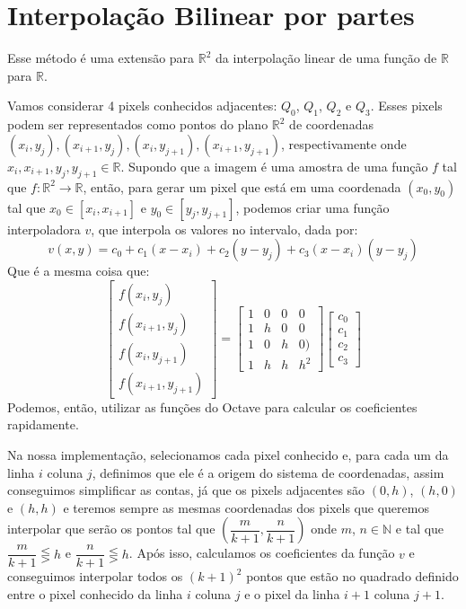 \documentclass{article}
\begin{document}
	\section{Interpolação Bilinear por partes}
	Esse método é uma extensão para $\mathbb{R}^2$ da interpolação linear de uma função de $\mathbb{R}$ para $\mathbb{R}$. \par
	Vamos considerar 4 pixels conhecidos adjacentes: $Q_{0}$, $Q_{1}$, $Q_{2}$ e $Q_{3}$. Esses pixels podem ser representados como pontos do plano $\mathbb{R}^2$ de coordenadas $(x_{i}, y_{j}), (x_{i+1}, y_{j}), (x_{i}, y_{j+1}), (x_{i+1}, y_{j+1})$, respectivamente onde $x_{i}, x_{i+1}, y_{j}, y_{j+1} \in \mathbb{R}$. Supondo que a imagem é uma amostra de uma função $f$ tal que $f: \mathbb{R}^2 \rightarrow \mathbb{R} $, então, para gerar um pixel que está em uma coordenada $(x_{0}, y_{0})$ tal que $x_{0} \in [x_{i}, x_{i+1}]$ e $y_{0} \in [y_{j}, y_{j+1}]$, podemos criar uma função interpoladora $v$, que interpola os valores no intervalo, dada por:
	 \begin{equation}
	 v(x, y) = c_{0} + c_{1}(x - x_{i}) + c_{2}(y - y_{j}) + c_{3}(x - x_{i})(y - y_{j})
	 \end{equation}
	 Que é a mesma coisa que:
	 \[
	 	\left[
	 		\begin{array}{llll}
				f(x_{i}, y_{j})\\
				f(x_{i+1}, y_{j})\\
				f(x_{i}, y_{j+1})\\
				f(x_{i+1}, y_{j+1})	 		
	 		\end{array}
	 	\right]
	 	=
	 	\left[
	 		\begin{array}{llll}
				1 & 0 & 0 & 0\\
				1 & h & 0 & 0\\
				1 & 0 & h & 0)\\
				1 & h & h & h^2	 		
	 		\end{array}
	 	\right]
	 	\left[
	 		\begin{array}{llll}
				c_{0}\\
				c_{1}\\
				c_{2}\\
				c_{3}	 		
	 		\end{array}
	 	\right]
	 \]
	 Podemos, então, utilizar as funções do Octave para calcular os coeficientes rapidamente. \par
	 Na nossa implementação, selecionamos cada pixel conhecido e, para cada um da linha $i$ coluna $j$, definimos que ele é a origem do sistema de coordenadas, assim conseguimos simplificar as contas, já que os pixels adjacentes são $(0, h)$, $(h,0)$ e $(h,h)$ e teremos sempre as mesmas coordenadas dos pixels que queremos interpolar que serão os pontos tal que $(\dfrac{m}{k+1}, \dfrac{n}{k+1})$ onde $m$, $n \in \mathbb{N}$ e tal que $\dfrac{m}{k+1} \lesseqgtr h$ e $\dfrac{n}{k+1} \lesseqgtr h$. Após isso, calculamos os coeficientes da função $v$ e conseguimos interpolar todos os $(k+1)^2$ pontos que estão no quadrado definido entre o pixel conhecido da linha $i$ coluna $j$ e o pixel da linha $i+1$ coluna $j+1$.\par
\end{document}
